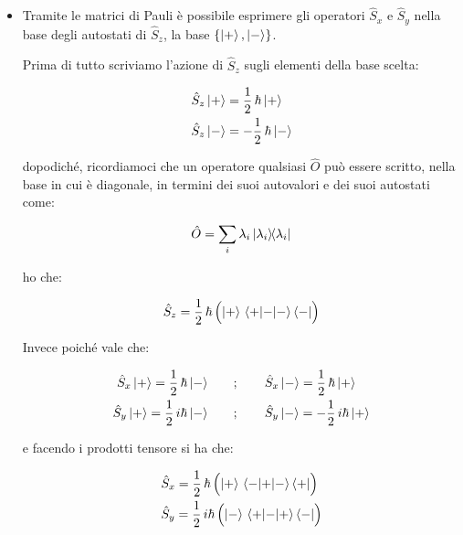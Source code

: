 \begin{itemize}

	\item Tramite le matrici di Pauli è possibile esprimere gli operatori $\hat{S}_x$ e $\hat{S}_y$ nella base degli autostati di $\hat{S}_z$, la base $\qty{\ket{+}, \ket{-}}$. 
	
		Prima di tutto scriviamo l'azione di $\hat{S}_z$ sugli elementi della base scelta:
	
	\begin{align*}
		& \hat{S}_z \ket{+} = \frac{1}{2} \, \hbar \ket{+} \\
		& \hat{S}_z \ket{-} = -\frac{1}{2} \, \hbar \ket{-}
	\end{align*}

		dopodiché, ricordiamoci che un operatore qualsiasi $\hat{O}$ può essere scritto, nella base in cui è diagonale, in termini dei suoi autovalori e dei suoi autostati come:
	
	\begin{align*}
		\hat{O} = \sum_i \lambda_i \ketbra{\lambda_i}
	\end{align*}
	
		ho che:
	
	\begin{nb}
	\begin{align*}
		\hat{S}_z = \frac{1}{2} \, \hbar \, \qty\Big( \ket{+} \mel{+}{-}{-} \bra{-} )
	\end{align*}
	\end{nb}
	
		Invece poiché vale che:
		
	\begin{align*}
		\hat{S}_x \ket{+} = \frac{1}{2} \, \hbar \ket{-} \qquad &; \qquad \hat{S}_x \ket{-} = \frac{1}{2} \, \hbar \ket{+} \\
		\hat{S}_y \ket{+} = \frac{1}{2} \, i\hbar \ket{-} \qquad &; \qquad \hat{S}_y \ket{-} = - \frac{1}{2} \, i\hbar \ket{+}
	\end{align*}

		e facendo i prodotti tensore si ha che:
		
	\begin{nb}
	\begin{align*}
		& \hat{S}_x = \frac{1}{2} \, \hbar \, \qty\Big( \ket{+} \mel{-}{+}{-} \bra{+} ) \\
		& \hat{S}_y = \frac{1}{2} \, i \hbar \, \qty\Big( \ket{-} \mel{+}{-}{+} \bra{-} )
	\end{align*}
	\end{nb}
	

\end{itemize}
